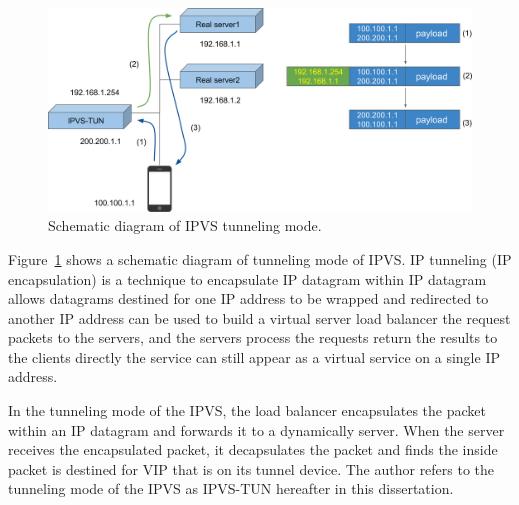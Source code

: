 \begin{figure}[h]
  \centering
  \includegraphics[width=0.95\columnwidth]{Figs/ipvs-tun-schem}

  \par\bigskip
  \centering
  \begin{minipage}{0.9\columnwidth}
    \caption[IPVS tunneling  mode]{
    Schematic diagram of IPVS tunneling mode.
    }
    \label{fig:ipvs-tun-schem}
  \end{minipage}
\end{figure}

Figure~\ref{fig:ipvs-tun-schem} shows a schematic diagram of  tunneling mode of IPVS.
IP tunneling (IP encapsulation) is a technique to encapsulate IP datagram within IP datagram
 allows datagrams destined for one IP address to be wrapped and redirected to another IP address \cite{kuznetsov1999tunnels} can be used to build a virtual server
 load balancer  the request packets  to the  servers,
and the  servers  process the requests return the results to the clients directly
 the service can still appear as a virtual service on a single IP address.

In the tunneling mode of the IPVS, the load balancer encapsulates the packet within an IP datagram and forwards it to a dynamically  server. 
When the  server receives the encapsulated packet, it decapsulates the packet and finds the inside packet is destined for VIP that is on its tunnel device.
%
The author refers to the tunneling mode of the IPVS as IPVS-TUN hereafter\deleted[id=4th]{,} in this dissertation.

